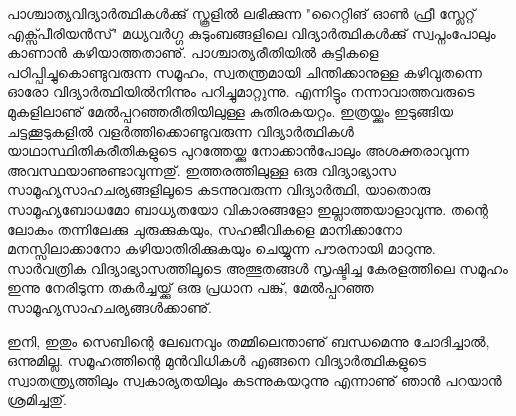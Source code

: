 പാശ്ചാത്യവിദ്യാര്‍ത്ഥികള്‍ക്കു് സ്കൂളില്‍ ലഭിക്കുന്ന "റൈറ്റിങ് ഓണ്‍ ഫ്രീ സ്ലേറ്റ് എക്സ്പീരിയന്‍സ്" മധ്യവര്‍ഗ്ഗ കുടുംബങ്ങളിലെ വിദ്യാര്‍ത്ഥികള്‍ക്കു് സ്വപ്നംപോലും കാണാന്‍ കഴിയാത്തതാണു്. പാശ്ചാത്യരീതിയില്‍ കുട്ടികളെ പഠിപ്പിച്ചുകൊണ്ടുവരുന്ന സമൂഹം, സ്വതന്ത്രമായി ചിന്തിക്കാനുള്ള കഴിവുതന്നെ ഓരോ വിദ്യാര്‍ത്ഥിയില്‍നിന്നും പറിച്ചുമാറ്റുന്നു. എന്നിട്ടും നന്നാവാത്തവരുടെ മുകളിലാണു് മേല്‍പ്പറഞ്ഞരീതിയിലുള്ള കുതിരകയറ്റം. ഇത്രയ്ക്കും ഇടുങ്ങിയ ചട്ടക്കൂടുകളില്‍ വളര്‍ത്തിക്കൊണ്ടുവരുന്ന വിദ്യാര്‍ത്ഥികള്‍ യാഥാസ്ഥിതികരീതികളുടെ പുറത്തേയ്ക്കു നോക്കാന്‍പോലും അശക്തരാവുന്ന അവസ്ഥയാണുണ്ടാവുന്നതു്. ഇത്തരത്തിലുള്ള ഒരു വിദ്യാഭ്യാസ സാമൂഹ്യസാഹചര്യങ്ങളിലൂടെ കടന്നുവരുന്ന വിദ്യാര്‍ത്ഥി, യാതൊരു സാമൂഹ്യബോധമോ ബാധ്യതയോ വികാരങ്ങളോ ഇല്ലാത്തയാളാവുന്നു. തന്റെ ലോകം തന്നിലേക്കു ചുരുക്കുകയും, സഹജീവികളെ മാനിക്കാനോ മനസ്സിലാക്കാനോ കഴിയാതിരിക്കുകയും ചെയ്യുന്ന പൗരനായി മാറുന്നു. സാര്‍വത്രിക വിദ്യാഭ്യാസത്തിലൂടെ അത്ഭുതങ്ങള്‍ സൃഷ്ടിച്ച കേരളത്തിലെ സമൂഹം ഇന്നു നേരിടുന്ന തകര്‍ച്ചയ്ക്കു് ഒരു പ്രധാന പങ്കു്, മേല്‍പ്പറഞ്ഞ സാമൂഹ്യസാഹചര്യങ്ങള്‍ക്കാണു്.

ഇനി, ഇതും സെബിന്റെ ലേഖനവും തമ്മിലെന്താണു് ബന്ധമെന്നു ചോദിച്ചാല്‍, ഒന്നുമില്ല. സമൂഹത്തിന്റെ മുന്‍വിധികള്‍ എങ്ങനെ വിദ്യാര്‍ത്ഥികളുടെ സ്വാതന്ത്ര്യത്തിലും സ്വകാര്യതയിലും കടന്നുകയറുന്നു എന്നാണു് ഞാന്‍ പറയാന്‍ ശ്രമിച്ചതു്.

\newpage
